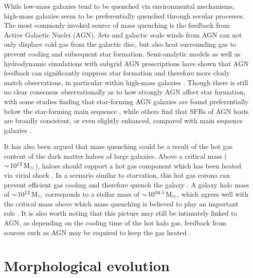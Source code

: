 While low-mass galaxies tend to be quenched via environmental
mechanisms, high-mass galaxies seem to be preferentially quenched
through secular processes.  The most commonly invoked source of mass
quenching is the feedback from Active Galactic Nuclei (AGN).  Jets and
galactic scale winds from AGN can not only displace cold gas from the
galactic disc, but also heat surrounding gas to prevent cooling and
subsequent star formation.  Semi-analytic models as well as
hydrodynamic simulations with subgrid AGN prescriptions have shown
that AGN feedback can significantly suppress star formation and
therefore more closly match observations, in
particular within high-mass galaxies \citep[e.g.][]{somerville2008,
  dubois2013, bongiorno2016}.  Though there is still no clear
consensus observationally as to how strongly AGN affect star
formation, with some studies finding that star-forming AGN galaxies
are found preferentially below the star-forming main sequence
\citep{gurkan2015, mullaney2015, ellison2016}, while
others find that SFRs of AGN hosts are broadly consistent, or even
slightly enhanced, compared with main sequence galaxies
\citep{santini2012, lanzuisi2015, stanley2015}.
\par
It has also been argued that mass quenching could be a result of the
hot gas content of the dark matter haloes of large galaxies.  Above a
critical mass ($\sim\!10^{12}\,\mathrm{M_{\odot}}$), haloes should support a hot gas
component which has been heated via virial shock \citep{birnboim2003}.  In a
scenario similar to starvation, this hot gas corona can prevent
efficient gas cooling and therefore quench the galaxy
\citep{cattaneo2006, gabor2015}.
A galaxy halo mass of $\sim\!10^{12}\,\mathrm{M_{\odot}}$ corresponds to a stellar
mass of $\sim\!10^{10.5}\,\mathrm{M_{\odot}}$, which agrees well with the critical
mass above which mass quenching is believed to play an important role
\citep{peng2010}.  It is also worth noting that this picture may still
be intimately linked to AGN, as depending on the cooling time of the
hot halo gas, feedback from sources such as AGN may be required to
keep the gas heated \citep{cattaneo2006}.

\section{Morphological evolution}
\label{sec:morph_evolution}

